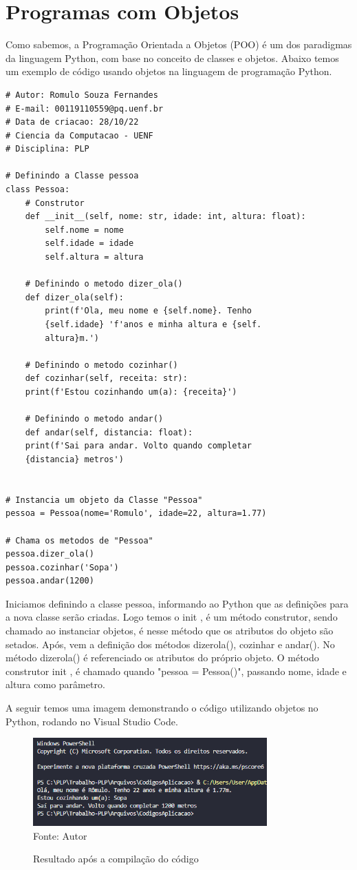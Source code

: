    \section{Programas com Objetos}
    Como sabemos, a Programação Orientada a Objetos (POO) é um dos paradigmas da linguagem
    Python, com base no conceito de classes e objetos. Abaixo temos um exemplo de código usando objetos na linguagem de programação Python.
\begin{lstlisting}
# Autor: Romulo Souza Fernandes
# E-mail: 00119110559@pq.uenf.br
# Data de criacao: 28/10/22
# Ciencia da Computacao - UENF
# Disciplina: PLP

# Definindo a Classe pessoa
class Pessoa:
	# Construtor
	def __init__(self, nome: str, idade: int, altura: float):
		self.nome = nome
		self.idade = idade
		self.altura = altura

	# Definindo o metodo dizer_ola()
	def dizer_ola(self):
		print(f'Ola, meu nome e {self.nome}. Tenho 
		{self.idade} 'f'anos e minha altura e {self.
		altura}m.')

	# Definindo o metodo cozinhar()
	def cozinhar(self, receita: str):
	print(f'Estou cozinhando um(a): {receita}')

	# Definindo o metodo andar()
	def andar(self, distancia: float):
	print(f'Sai para andar. Volto quando completar 
	{distancia} metros')


# Instancia um objeto da Classe "Pessoa"
pessoa = Pessoa(nome='Romulo', idade=22, altura=1.77)

# Chama os metodos de "Pessoa"
pessoa.dizer_ola()
pessoa.cozinhar('Sopa')
pessoa.andar(1200)
\end{lstlisting}
	Iniciamos definindo a classe pessoa, informando ao Python que as definições para a nova classe serão criadas. Logo temos o \textunderscore\textunderscore init \textunderscore\textunderscore, é um método construtor, sendo chamado ao instanciar objetos, é nesse método que os atributos do objeto são setados. Após, vem a definição dos métodos dizer\textunderscore ola(), cozinhar e andar(). No método dizer\textunderscore ola() é referenciado os atributos do próprio objeto. O método construtor \textunderscore\textunderscore init \textunderscore\textunderscore, é chamado quando "pessoa = Pessoa()", passando nome, idade e altura como parâmetro.
	
	A seguir temos uma imagem demonstrando o código utilizando objetos no Python, rodando no Visual Studio Code.
    \begin{figure}[H]
    	\begin{center}
    		\caption{Resultado após a compilação do código} \label{ling1}
    		\includegraphics[width=9cm]{objetos.png} \\
    		{\tiny \sf Fonte:{ Autor}}
    	\end{center}
    \end{figure}
    
